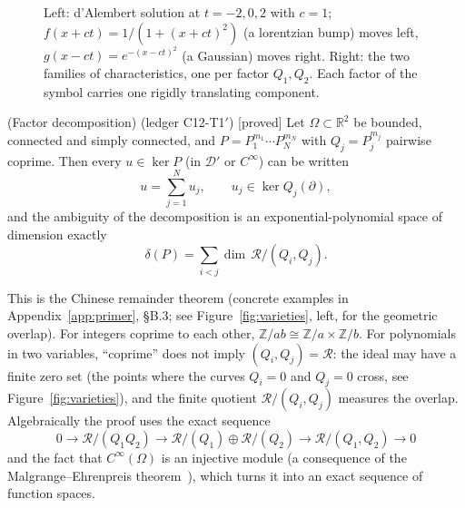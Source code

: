 \documentclass[11pt,a4paper]{article}
\theoremstyle{definition}
\newcommand{\badge}[2]{\textcolor{#1}{\textsf{\footnotesize[#2]}}}
\newcommand{\proved}[1][]{\badge{cC}{proved#1}}
\newcommand{\led}[1]{\textcolor{cG}{\textsf{\footnotesize(ledger #1)}}}
\newcommand{\R}{\mathbb{R}}\newcommand{\C}{\mathbb{C}}\newcommand{\N}{\mathbb{N}}\newcommand{\Z}{\mathbb{Z}}
\newcommand{\ring}{\mathcal{R}}
\DeclareMathOperator{\dimc}{dim}
\begin{document}
\begin{figure}[!htb]
\centering
{}
\hfill
{}
\caption{Left: d'Alembert solution at $t=-2,0,2$ with $c=1$; $f(x+ct)=1/(1+(x+ct)^2)$ (a lorentzian bump) moves left, $g(x-ct)=e^{-(x-ct)^2}$ (a Gaussian) moves right. Right: the two families of characteristics, one per factor $Q_1,Q_2$. Each factor of the symbol carries one rigidly translating component.}\label{fig:wave}
\end{figure}

\begin{theorem}{(Factor decomposition) \led{C12-T1$'$} \proved[]}\label{thm:factor}
Let $\Omega\subset\R^2$ be bounded, connected and simply connected, and $P=P_1^{m_1}\cdots P_N^{m_N}$ with $Q_j=P_j^{m_j}$ pairwise coprime. Then every $u\in\ker P$ (in $\mathcal D'$ or $C^\infty$) can be written
\[
u=\sum_{j=1}^Nu_j,\qquad u_j\in\ker Q_j(\partial),
\]
and the ambiguity of the decomposition is an exponential-polynomial space of dimension exactly
\[
\delta(P)=\sum_{i<j}\dimc\,\ring/(Q_i,Q_j).
\]
\end{theorem}
\begin{intuition}
This is the Chinese remainder theorem (concrete examples in Appendix~\ref{app:primer}, \S B.3; see Figure~\ref{fig:varieties}, left, for the geometric overlap). For integers coprime to each other, $\Z/ab\cong\Z/a\times\Z/b$. For polynomials in two variables, ``coprime'' does not imply $(Q_i,Q_j)=\ring$: the ideal may have a finite zero set (the points where the curves $Q_i=0$ and $Q_j=0$ cross, see Figure~\ref{fig:varieties}), and the finite quotient $\ring/(Q_i,Q_j)$ measures the overlap. Algebraically the proof uses the exact sequence
\[
0\to\ring/(Q_1Q_2)\to\ring/(Q_1)\oplus\ring/(Q_2)\to\ring/(Q_1,Q_2)\to0
\]
and the fact that $C^\infty(\Omega)$ is an injective module (a consequence of the Malgrange--Ehrenpreis theorem~\cite{eh,ma}), which turns it into an exact sequence of function spaces.
\end{intuition}
\end{document}
